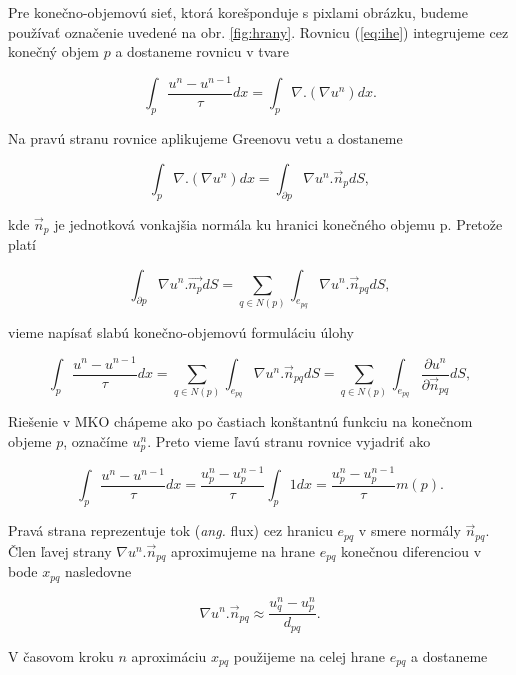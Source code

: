 \documentclass[a4paper,11pt,oneside]{article}%
\begin{document}
Pre konečno-objemovú sieť, ktorá korešponduje s pixlami obrázku, budeme používať označenie uvedené na obr. \ref{fig:hrany}.
Rovnicu (\ref{eq:ihe}) integrujeme cez konečný objem $p$ a dostaneme rovnicu v tvare

\begin{equation} 
\int_p\frac{u^n - u^{n-1}}{\tau} dx = \int_p\nabla . (\nabla u^n)dx.
\end{equation}

Na pravú stranu rovnice aplikujeme Greenovu vetu a dostaneme

\begin{equation} 
\int_p\nabla . (\nabla u^n)dx = \int_{\partial p} \nabla u^n . \vec{n}_pdS,
\end{equation}

kde $\vec{n}_p$ je jednotková vonkajšia normála ku hranici konečného objemu p.
Pretože platí

\begin{equation} 
\int_{\partial p} \nabla u^n . \vec{n_p}dS = \sum_{q\in N(p)}\int_{e_{pq}} \nabla u^n . \vec{n}_{pq}dS,
\end{equation}

vieme napísať slabú konečno-objemovú formuláciu úlohy

\begin{equation} 
\int_p\frac{u^n - u^{n-1}}{\tau} dx = \sum_{q\in N(p)}\int_{e_{pq}} \nabla u^n . \vec{n}_{pq}dS = \sum_{q\in N(p)}\int_{e_{pq}} \frac{\partial u^n}{\partial \vec{n}_{pq}} dS,
\end{equation}

Riešenie v MKO chápeme ako po častiach konštantnú funkciu na konečnom objeme $p$, označíme $u_p^n$. Preto vieme ľavú stranu rovnice vyjadriť ako 

\begin{equation} 
\int_p\frac{u^n - u^{n-1}}{\tau} dx =  \frac{u_p^n - u_p^{n-1}}{\tau} \int_p 1 dx= \frac{u_p^n - u_p^{n-1}}{\tau} m(p).
\end{equation}

Pravá strana reprezentuje tok (\textit{ang.} flux) cez hranicu $e_{pq}$ v smere normály $\vec{n}_{pq}$. Člen ľavej strany $\nabla u^n . \vec{n}_{pq}$ aproximujeme na hrane $e_{pq}$ konečnou diferenciou v bode $x_{pq}$ nasledovne

\begin{equation}
\nabla u^n . \vec{n}_{pq} \approx \frac{u^n_q - u^n_p}{d_{pq}}.
\end{equation}

V časovom kroku $n$ aproximáciu $x_{pq}$ použijeme na celej hrane $e_{pq}$ a dostaneme
\end{document}
